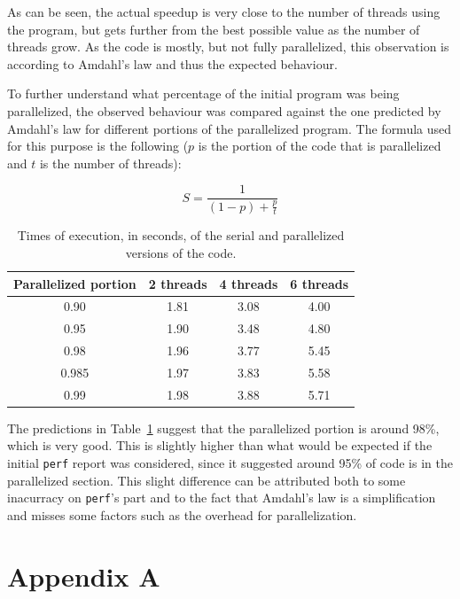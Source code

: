 \documentclass{article}
\begin{document}
As can be seen, the actual speedup is very close to the number of threads
using the program, but gets further from the best possible value as the number
of threads grow. As the code is mostly, but not fully parallelized, this 
observation is according to Amdahl's law and thus the expected behaviour.

To further understand what percentage of the initial program was being parallelized,
the observed behaviour was compared against the one predicted by Amdahl's law
for different portions of the parallelized program. The formula used for this 
purpose is the following ($p$ is the portion of the code that is parallelized and $t$ is 
the number of threads): 

\begin{equation}
	S = \frac{1}{(1-p) + \frac{p}{t}}
\end{equation}

\begin{table}[h!]
	\centering
	\begin{tabular}{||c c c c||} 
	 \hline
	 Parallelized portion & 2 threads & 4 threads & 6 threads \\ [0.5ex] 
	 \hline\hline
	 0.90 & 1.81 & 3.08 & 4.00 \\ 
	 0.95 & 1.90 & 3.48 & 4.80 \\ 
	 0.98 & 1.96 & 3.77 & 5.45 \\ 
	 0.985 & 1.97 & 3.83 & 5.58 \\ 
	 0.99 & 1.98 & 3.88 & 5.71 \\ [1ex] 
	 \hline
	\end{tabular}
	\caption{Times of execution, in seconds, of the serial and parallelized versions of the code.}
	\label{amdahl}
\end{table}

The predictions in Table~\ref{amdahl} suggest that the parallelized portion is
around 98\%, which is very good. This is slightly higher than what would be
expected if the initial \texttt{perf} report was considered, since it suggested
around 95\% of code is in the parallelized section. This slight difference
can be attributed both to some inacurracy on \texttt{perf}'s part and to the
fact that Amdahl's law is a simplification and misses some factors such as the
overhead for parallelization.

\section{Appendix A}
\end{document}
